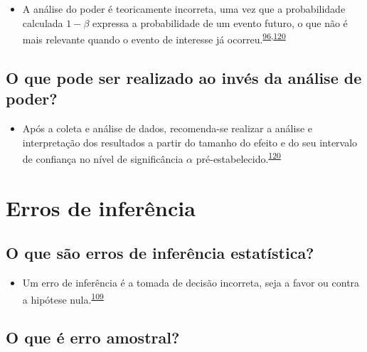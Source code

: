 \documentclass[
  a4paper,
]{book}
\providecommand{\tightlist}{%
  \setlength{\itemsep}{0pt}\setlength{\parskip}{0pt}}
\begin{document}
\begin{itemize}
\tightlist
\item
  A análise do poder é teoricamente incorreta, uma vez que a probabilidade calculada \(1-\beta\) expressa a probabilidade de um evento futuro, o que não é mais relevante quando o evento de interesse já ocorreu.\textsuperscript{\protect\hyperlink{ref-Cummings2003}{96},\protect\hyperlink{ref-heckman2022}{120}}
\end{itemize}

\hypertarget{o-que-pode-ser-realizado-ao-invuxe9s-da-anuxe1lise-de-poder}{%
\subsection{O que pode ser realizado ao invés da análise de poder?}\label{o-que-pode-ser-realizado-ao-invuxe9s-da-anuxe1lise-de-poder}}

\begin{itemize}
\tightlist
\item
  Após a coleta e análise de dados, recomenda-se realizar a análise e interpretação dos resultados a partir do tamanho do efeito e do seu intervalo de confiança no nível de significância \(\alpha\) pré-estabelecido.\textsuperscript{\protect\hyperlink{ref-heckman2022}{120}}
\end{itemize}

\hypertarget{erros-de-inferuxeancia}{%
\section{Erros de inferência}\label{erros-de-inferuxeancia}}

\hypertarget{o-que-suxe3o-erros-de-inferuxeancia-estatuxedstica}{%
\subsection{O que são erros de inferência estatística?}\label{o-que-suxe3o-erros-de-inferuxeancia-estatuxedstica}}

\begin{itemize}
\tightlist
\item
  Um erro de inferência é a tomada de decisão incorreta, seja a favor ou contra a hipótese nula.\textsuperscript{\protect\hyperlink{ref-Curran-Everett2009}{109}}
\end{itemize}

\hypertarget{o-que-uxe9-erro-amostral}{%
\subsection{O que é erro amostral?}\label{o-que-uxe9-erro-amostral}}
\end{document}
